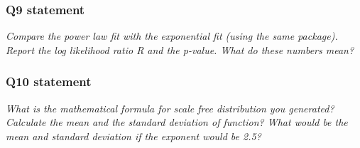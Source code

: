 \documentclass{article}
\begin{document}
\subsubsection{Q9 statement}
\textit{Compare the power law fit with the exponential fit (using the same package). Report the log likelihood ratio R and the p-value. What do these numbers mean?}

\subsubsection{Q10 statement}
\textit{What is the mathematical formula for scale free distribution you generated? Calculate the mean and the standard deviation of function? What would be the mean and standard deviation if the exponent would be 2.5?}
\end{document}
